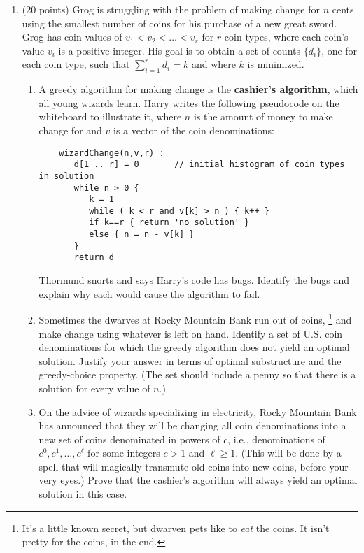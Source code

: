 \documentclass[12pt]{article}
\begin{document}
\begin{enumerate}
	\item (20 points) Grog is struggling with the problem of making change for $n$ cents using the smallest number of coins for his purchase of a new great sword. Grog has coin values of $v_{1}<v_{2}<\dots<v_{r}$ for $r$ coin types, where each coin's value $v_{i}$ is a positive integer. His goal is to obtain a set of counts $\{d_{i}\}$, one for each coin type, such that $\sum_{i=1}^{r}d_{i}=k$ and where $k$ is minimized.
	\begin{enumerate}
	\item A greedy algorithm for making change is the \textbf{cashier's algorithm}, which all young wizards learn. Harry writes the following pseudocode on the whiteboard to illustrate it, where $n$ is the amount of money to make change for and $v$ is a vector of the coin denominations:
	\begin{small}
	\begin{verbatim}
	wizardChange(n,v,r) :
	   d[1 .. r] = 0       // initial histogram of coin types in solution
	   while n > 0 {
	      k = 1
	      while ( k < r and v[k] > n ) { k++ }
	      if k==r { return 'no solution' }
	      else { n = n - v[k] }
	   }
	   return d
	\end{verbatim}
	\end{small}
	Thormund snorts and says Harry's code has bugs. Identify the bugs and explain why each would cause the algorithm to fail.
	
	\item Sometimes the dwarves at Rocky Mountain Bank run out of coins,%
	\footnote{It's a little known secret, but dwarven pets like to \textit{eat} the coins. It isn't pretty for the coins, in the end.}
	and make change using whatever is left on hand. Identify a set of U.S. coin denominations for which the greedy algorithm does not yield an optimal solution. Justify your answer in terms of optimal substructure and the greedy-choice property. (The set should include a penny so that there is a solution for every value of $n$.)
	
	
	\item On the advice of wizards specializing in electricity, Rocky Mountain Bank has announced that they will be changing all  coin denominations into a new set of coins denominated in powers of $c$, i.e., denominations of $c^{0}, c^{1}, \dots , c^{\ell}$ for some integers $c>1$ and $\ell\geq 1$.  (This will be done by a spell that will magically transmute old coins into new coins, before your very eyes.) Prove that the cashier's algorithm will always yield an optimal solution in this case.
	

\end{enumerate}
\end{enumerate}
\end{document}
